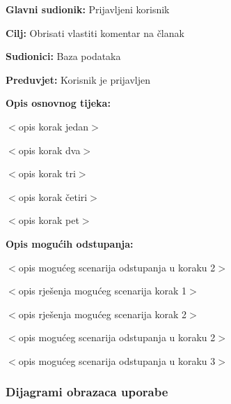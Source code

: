 \noindent {}
\begin{packed_item}

\item \textbf{Glavni sudionik:} Prijavljeni korisnik
\item  \textbf{Cilj:} Obrisati vlastiti komentar na članak
\item  \textbf{Sudionici:} Baza podataka
\item  \textbf{Preduvjet:} Korisnik je prijavljen
\item  \textbf{Opis osnovnog tijeka:}

\item[] \begin{packed_enum}

    \item $<$opis korak jedan$>$
    \item $<$opis korak dva$>$
    \item $<$opis korak tri$>$
    \item $<$opis korak četiri$>$
    \item $<$opis korak pet$>$

\end{packed_enum}

\item  \textbf{Opis mogućih odstupanja:}

\item[] \begin{packed_item}

    \item[2.a] $<$opis mogućeg scenarija odstupanja u koraku 2$>$
    \item[] \begin{packed_enum}

        \item $<$opis rješenja mogućeg scenarija korak 1$>$
        \item $<$opis rješenja mogućeg scenarija korak 2$>$

    \end{packed_enum}

\item[2.b] $<$opis mogućeg scenarija odstupanja u koraku 2$>$
\item[3.a] $<$opis mogućeg scenarija odstupanja  u koraku 3$>$

\end{packed_item}
\end{packed_item}

\subsubsection{Dijagrami obrazaca uporabe}

